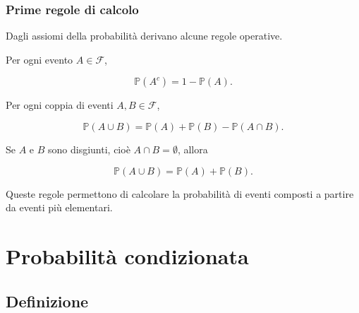 \documentclass[handout]{beamer}%
\providecommand{\Prob}{\mathbb{P}}
\providecommand{\F}{\mathcal{F}}
\providecommand{\1}{\mathbf{1}}
\providecommand{\QTR}[2]{\csname #1\endcsname{#2}}
\begin{document}
\begin{frame}%
%

\frametitle{Prime regole di calcolo}%


Dagli assiomi della probabilit\`{a} derivano alcune regole operative.

\medskip

Per ogni evento $A\in\F$,%

\[
\Prob(A^{c})=1-\Prob(A).
\]


\medskip

Per ogni coppia di eventi $A,B\in\F$,%

\[
\Prob(A\cup B) = \Prob(A)+\Prob(B)-\Prob(A\cap B).
\]


\medskip

Se $A$ e $B$ sono disgiunti, cio\`{e} $A\cap B=\emptyset$, allora%

\[
\Prob(A\cup B) = \Prob(A)+\Prob(B).
\]


\medskip

Queste regole permettono di calcolare la probabilit\`{a} di eventi composti a
partire da eventi pi\`{u} elementari.%

\transboxout
\end{frame}%




\section{Probabilit\`{a} condizionata}

\subsection{Definizione}%
\end{document}
